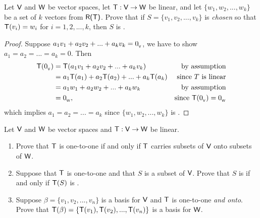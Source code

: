 \begin{exercise} \label{exercise 2.1.13}
Let \(\textsf{V}\) and \(\textsf{W}\) be vector spaces, let \(\textsf{T} : \textsf{V} \to \textsf{W}\) be linear, and let \(\{ w_1, w_2, ..., w_k \}\) be a \emph{\LID{}} set of \(k\) vectors from \(\textsf{R(T)}\).
Prove that if \(S = \{ v_1, v_2, ..., v_k \}\) is \emph{chosen} so that \(\textsf{T}(v_i) = w_i\) for \(i = 1, 2, ..., k\), then \(S\) is \emph{\LID{}}.
\end{exercise}

\begin{proof}
Suppose \(a_1 v_1 + a_2 v_2 + ... + a_k v_k = 0_{_{\textsf{V}}}\), we have to show \(a_1 = a_2 = ... = a_k = 0\).
Then
\begin{align*}
    \textsf{T}(0_{_{\textsf{V}}}) & = \textsf{T}(a_1 v_1 + a_2 v_2 + ... + a_k v_k) & \text{by assumption} \\
            & = a_1\textsf{T}(a_1) + a_2\textsf{T}(a_2) + ... + a_k\textsf{T}(a_k) & \text{since \(T\) is linear} \\
            & = a_1 w_1 + a_2 w_2 + ... + a_k w_k & \text{by assumption} \\
            & = 0_{_{\textsf{W}}}, & \text{since \(\textsf{T}(0_{_{\textsf{V}}}) = 0_{_{\textsf{W}}}\)}
\end{align*}
which implies \(a_1 = a_2 = ... = a_k\) since \(\{ w_1, w_2, ..., w_k \}\) is \LID{}.
\end{proof}

\begin{exercise} \label{exercise 2.1.14}
Let \(\textsf{V}\) and \(\textsf{W}\) be vector spaces and \(\textsf{T} : \textsf{V} \to \textsf{W}\) be linear.
\begin{enumerate}
\item Prove that \(\textsf{T}\) is one-to-one if and only if \(\textsf{T}\) carries \LID{} subsets of \(\textsf{V}\) onto \LID{} subsets of \(\textsf{W}\).
\item Suppose that \(\textsf{T}\) is one-to-one and that \(S\) is a subset of \(\textsf{V}\).
    Prove that \(S\) is \LID{} if and only if \(\textsf{T}(S)\) is \LID{}.
\item Suppose \(\beta = \{ v_1, v_2, ..., v_n \}\) is a basis for \(\textsf{V}\) and \(\textsf{T}\) is one-to-one \emph{and onto}.
    Prove that \(\textsf{T}(\beta) = \{ \textsf{T}(v_1), \textsf{T}(v_2), ..., \textsf{T}(v_n) \}\) is a basis for \(\textsf{W}\).
\end{enumerate}
\end{exercise}

